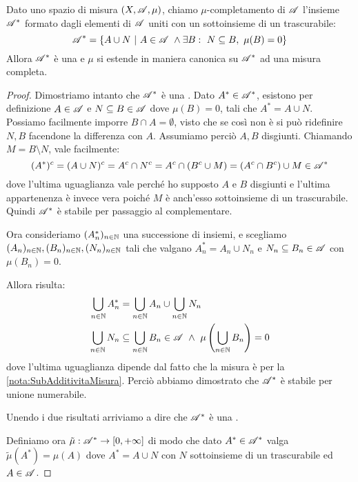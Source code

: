 \begin{proposition}\label{prop:CompletamentoMisura}
	Dato uno spazio di misura $(X,\mathscr A,\mu)$, chiamo $\mu$-completamento di $\mathscr A$ l'insieme $\mathscr A^*$ formato dagli elementi di $\mathscr A$ uniti con un sottoinsieme di un trascurabile:
	\begin{equation*}
		\A^*=\{A\cup N\ |\ A\in\A\ \wedge \exists B:\ N\subseteq B,\ \mu(B)=0\}
	\end{equation*}
	Allora $\mathscr A^*$ è una \sigalg{} e $\mu$ si estende in maniera canonica su $\mathscr A^*$ ad una misura completa.
\end{proposition}
\begin{proof}
	Dimostriamo intanto che $\mathscr A^*$ è una \sigalg{}.
	Dato $A^*\in\mathscr A^*$, esistono per definizione $A\in\mathscr A$ e $N\subseteq B\in\mathscr A$ dove $\mu(B)=0$, tali che $A^*=A\cup N$. Possiamo facilmente imporre $B\cap A=\emptyset$, visto che se così non è si può ridefinire $N,B$ facendone la differenza con $A$. Assumiamo perciò $A,B$ disgiunti.
	Chiamando $M=B\setminus N$, vale facilmente:
	\begin{equation*}
		(A^*)^c=(A\cup N)^c=A^c\cap N^c=A^c\cap(B^c\cup M)=(A^c\cap B^c )\cup M \in\mathscr A^*
	\end{equation*}
	dove l'ultima uguaglianza vale perché ho supposto $A$ e $B$ disgiunti e l'ultima appartenenza è invece vera poiché $M$ è anch'esso sottoinsieme di un trascurabile. Quindi $\mathscr A^*$ è stabile per passaggio al complementare.
	
	Ora consideriamo $(A^*_n)_{n\in\mathbb N}$ una successione di insiemi, e scegliamo $(A_n)_{n\in\mathbb N},(B_n)_{n\in\mathbb N},(N_n)_{n\in\mathbb N}$ tali che valgano $A^*_n=A_n\cup N_n$ e $N_n\subseteq B_n\in\mathscr A$ con $\mu(B_n)=0$.
	
	Allora risulta:
	\begin{align*}
		\bigcup_{n\in\N}A^*_n &=\bigcup_{n\in\N}A_n \cup \bigcup_{n\in\N}N_n\\
		\bigcup_{n\in\N}N_n &\subseteq \bigcup_{n\in\N}B_n\in\A\ \wedge\ \mu\left(\bigcup_{n\in\N}B_n\right)=0
	\end{align*}
	dove l'ultima uguaglianza dipende dal fatto che la misura è \sigsubadd{} per la \cref{nota:SubAdditivitaMisura}. Perciò abbiamo dimostrato che $\mathscr A^*$ è stabile per unione numerabile.
	
	Unendo i due risultati arriviamo a dire che $\mathscr A^*$ è una \sigalg{}.
	
	Definiamo ora $\tilde\mu:\mathscr A^*\to[0,+\infty]$ di modo che dato $A^*\in\mathscr A^*$ valga $\tilde\mu(A^*)=\mu(A)$ dove $A^*=A\cup N$ con $N$ sottoinsieme di un trascurabile ed $A\in\mathscr A$.
	

\end{proof}
